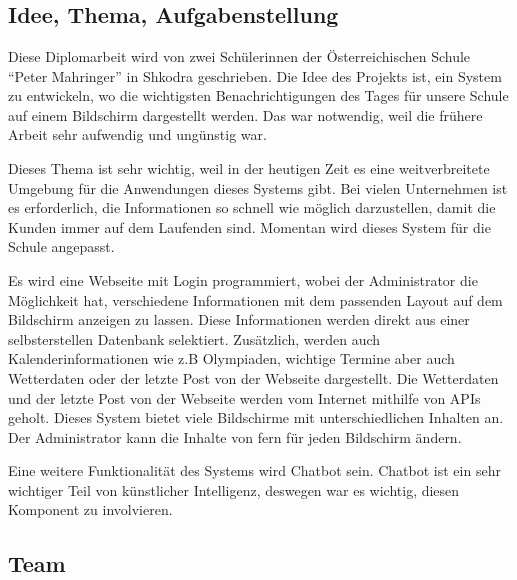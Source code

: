 \chapter{\docname}
\label{\docname}

\section{Idee, Thema, Aufgabenstellung}
Diese Diplomarbeit wird von zwei Sch\"{u}lerinnen der \"{O}sterreichischen Schule \textquotedblleft{}Peter Mahringer\textquotedblright{} in Shkodra geschrieben. Die Idee des Projekts ist, ein System zu entwickeln, wo die wichtigsten Benachrichtigungen des Tages f\"{u}r unsere Schule auf einem Bildschirm dargestellt werden. Das war notwendig, weil die fr\"{u}here Arbeit sehr aufwendig und ung\"{u}nstig war.  

Dieses Thema ist sehr wichtig, weil in der heutigen Zeit es eine weitverbreitete Umgebung f\"{u}r die Anwendungen dieses Systems gibt. Bei vielen Unternehmen ist es erforderlich, die Informationen so schnell wie m\"{o}glich darzustellen, damit die Kunden immer auf dem Laufenden sind. Momentan wird dieses System f\"{u}r die Schule angepasst.  

Es wird eine Webseite mit Login programmiert, wobei der Administrator die M\"{o}glichkeit hat, verschiedene Informationen mit dem passenden Layout auf dem Bildschirm anzeigen zu lassen. Diese Informationen werden direkt aus einer selbsterstellen Datenbank selektiert. Zus\"{a}tzlich, werden auch Kalenderinformationen wie z.B Olympiaden, wichtige Termine aber auch Wetterdaten oder der letzte Post von der Webseite dargestellt. Die Wetterdaten und der letzte Post von der Webseite werden vom Internet mithilfe von APIs geholt.  
Dieses System bietet viele Bildschirme mit unterschiedlichen Inhalten an. Der Administrator kann die Inhalte von fern f\"{u}r jeden Bildschirm \"{a}ndern. 

Eine weitere Funktionalit\"{a}t des Systems wird Chatbot sein. Chatbot ist ein sehr wichtiger Teil von k\"{u}nstlicher Intelligenz, deswegen war es wichtig, diesen Komponent zu involvieren. 


\section{Team}

